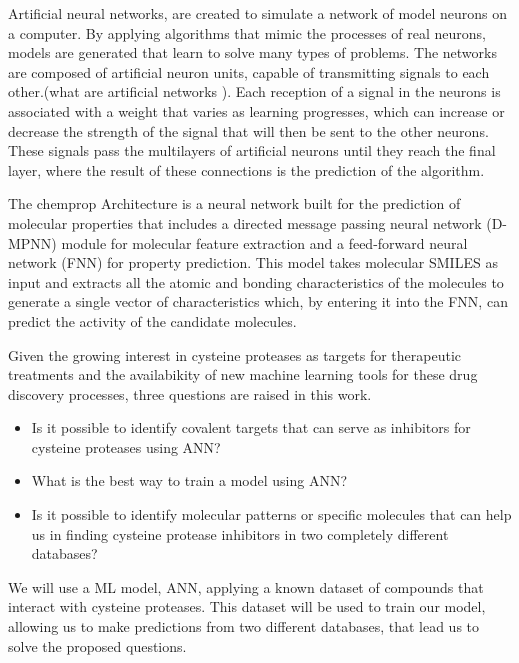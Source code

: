 \documentclass[final,times,twocolumn,article]{elsarticle}
\begin{document}
Artificial neural networks, are created to simulate a network of model neurons on a computer. By applying algorithms that mimic the processes of real neurons, models are generated that learn to solve many types of problems. The networks are composed of artificial neuron units, capable of transmitting signals to each other.(what are artificial networks ). Each reception of a signal in the neurons is associated with a weight that varies as learning progresses, which can increase or decrease the strength of the signal that will then be sent to the other neurons. These signals pass the multilayers of artificial neurons until they reach the final layer, where the result of these connections is the prediction of the algorithm. \cite{Talevi2020}

The chemprop Architecture is a neural network built for the prediction of molecular properties that includes a directed message passing neural network (D-MPNN) module for molecular feature extraction and a feed-forward neural network (FNN) for property prediction. This model takes molecular SMILES as input and extracts all the atomic and bonding characteristics of the molecules to generate a single vector of characteristics which, by entering it into the FNN, can predict the activity of the candidate molecules. \cite{Wang2022}

Given the growing interest in cysteine proteases as targets for therapeutic treatments and the availabikity of new machine learning tools for these drug discovery processes, three questions are raised in this work.

\begin{itemize}
    \item Is it possible to identify covalent targets that can serve as inhibitors for cysteine proteases using ANN?
    \item What is the best way to train a model using ANN?
    \item Is it possible to identify molecular patterns or specific molecules that can help us in finding cysteine protease inhibitors in two completely different databases?
    
\end{itemize}


We will use a ML model, ANN, applying a known dataset of compounds that interact with cysteine proteases. This dataset will be used to train our model, allowing us to make predictions from two different databases, that lead us to solve the proposed questions.
\end{document}
